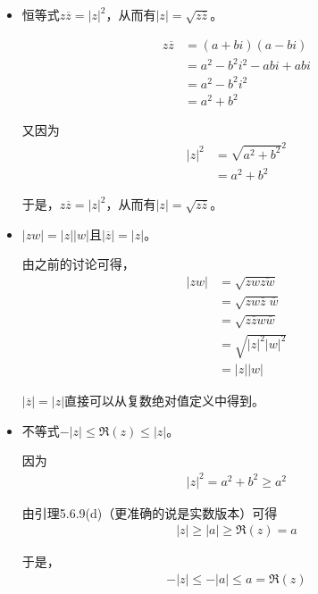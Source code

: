 \documentclass{article}
\begin{document}
\begin{itemize}
  \item 恒等式$z\overline{z} = |z|^2$，从而有$|z| = \sqrt{z \overline{z}}$。

        \begin{align*}
          z \overline{z} & = (a + bi)(a - bi)         \\
                         & = a^2 - b^2i^2 - abi + abi \\
                         & = a^2 - b^2i^2             \\
                         & = a^2 + b^2
        \end{align*}

        又因为
        \begin{align*}
          |z|^2 & = \sqrt{a^2 + b^2}^2 \\
                & = a^2 + b^2
        \end{align*}

        于是，$z\overline{z} = |z|^2$，从而有$|z| = \sqrt{z \overline{z}}$。

  \item $|zw| = |z||w|$且$|\overline{z}| = |z|$。

        由之前的讨论可得，
        \begin{align*}
          |zw| & = \sqrt{zw\overline{zw}}              \\
               & = \sqrt{zw\overline{z}\;\overline{w}} \\
               & = \sqrt{z\overline{z}w\overline{w}}   \\
               & = \sqrt{|z|^2|w|^2}                   \\
               & = |z||w|
        \end{align*}

        $|\overline{z}| = |z|$直接可以从复数绝对值定义中得到。

  \item 不等式$-|z| \leq \mathfrak{R}(z) \leq |z|$。

        因为
        \begin{align*}
          |z|^2 = a^2 + b^2 \geq a^2
        \end{align*}

        由引理5.6.9(d)（更准确的说是实数版本）可得
        \begin{align*}
          |z| \geq |a| \geq \mathfrak{R}(z) = a
        \end{align*}

        于是，
        \begin{align*}
          -|z| \leq -|a| \leq a = \mathfrak{R}(z)
        \end{align*}


\end{itemize}
\end{document}
